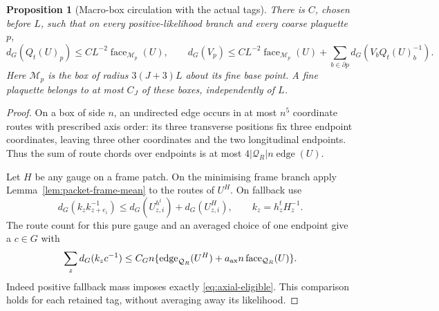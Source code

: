 \documentclass[11pt,reqno]{amsart}
\numberwithin{equation}{section}
\newtheorem{proposition}[theorem]{Proposition}
\theoremstyle{definition}
\theoremstyle{remark}
\begin{document}
\begin{proposition}[Macro-box circulation with the actual tags]
\label{prop:packet-macro-circulation}
There is \(C\), chosen before \(L\), such that on every
positive-likelihood branch and every coarse plaquette \(p\),
\begin{equation}
 d_G(Q_t(U)_p)\le CL^{-2}\operatorname{face}_{\mathcal M_p}(U),
 \qquad
 d_G(V_p)\le CL^{-2}\operatorname{face}_{\mathcal M_p}(U)
                    +\sum_{b\in\partial p}d_G(V_bQ_t(U)_b^{-1}).
 \label{eq:packet-macro-bound}
\end{equation}
Here \(\mathcal M_p\) is the box of radius \(3(J+3)L\)
about its fine base point. A fine plaquette belongs to at most
\(C_J\) of these boxes, independently of \(L\).
\end{proposition}
\begin{proof}
On a box of side \(n\), an undirected edge occurs in at most
\(n^5\) coordinate routes with prescribed axis order: its three
transverse positions fix three endpoint coordinates, leaving
three other coordinates and the two longitudinal endpoints.
Thus the sum of route chords over endpoints is at most
\(4|\mathcal Q_R|n\operatorname{edge}(U)\).

Let \(H\) be any gauge on a frame patch. On the minimising
frame branch apply Lemma~\ref{lem:packet-frame-mean} to the
routes of \(U^H\). On fallback use
\[
 d_G(k_zk_{z+e_i}^{-1})
       \le d_G(U^{h^t}_{z,i})+d_G(U^H_{z,i}),
                  \qquad k_z=h_z^tH_z^{-1}.
\]
The route count for this pure gauge and an averaged choice of
one endpoint give a \(c\in G\) with
\[
 \sum_zd_G(k_zc^{-1})
   \le C_G n\{\operatorname{edge}_{\mathcal Q_R}(U^H)
                         +a_{\rm ax}n\operatorname{face}_{\mathcal Q_R}(U)\}.
\]
Indeed positive fallback mass imposes exactly
\eqref{eq:axial-eligible}. This comparison holds for each
retained tag, without averaging away its likelihood.


\end{proof}
\end{document}
